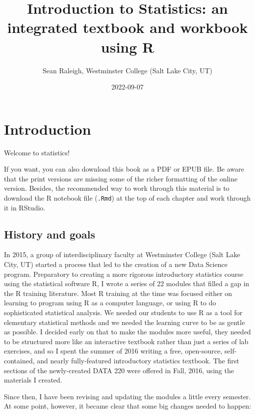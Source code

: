 \documentclass[
]{book}
\title{Introduction to Statistics: an integrated textbook and workbook using R}
\author{Sean Raleigh, Westminster College (Salt Lake City, UT)}
\date{2022-09-07}
\begin{document}
\maketitle

{
\setcounter{tocdepth}{1}
\tableofcontents
}
\hypertarget{intro}{%
\chapter*{Introduction}\label{intro}}

Welcome to statistics!

If you want, you can also download this book as a PDF or EPUB file. Be aware that the print versions are missing some of the richer formatting of the online version. Besides, the recommended way to work through this material is to download the R notebook file (\texttt{.Rmd}) at the top of each chapter and work through it in RStudio.

\hypertarget{intro-history}{%
\section*{History and goals}\label{intro-history}}

In 2015, a group of interdisciplinary faculty at Westminster College (Salt Lake City, UT) started a process that led to the creation of a new Data Science program. Preparatory to creating a more rigorous introductory statistics course using the statistical software R, I wrote a series of 22 modules that filled a gap in the R training literature. Most R training at the time was focused either on learning to program using R as a computer language, or using R to do sophisticated statistical analysis. We needed our students to use R as a tool for elementary statistical methods and we needed the learning curve to be as gentle as possible. I decided early on that to make the modules more useful, they needed to be structured more like an interactive textbook rather than just a series of lab exercises, and so I spent the summer of 2016 writing a free, open-source, self-contained, and nearly fully-featured introductory statistics textbook. The first sections of the newly-created DATA 220 were offered in Fall, 2016, using the materials I created.

Since then, I have been revising and updating the modules a little every semester. At some point, however, it became clear that some big changes needed to happen:
\end{document}
